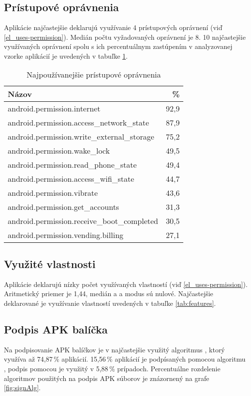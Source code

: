 \subsection*{Prístupové oprávnenia}

Aplikácie najčastejšie deklarujú využívanie 4 prístupových oprávnení (viď \ref{el_uses-permission}). Medián počtu vyžadovaných oprávnení je 8. 10 najčastejšie využívaných oprávnení spolu s ich percentuálnym zastúpením v analyzovanej vzorke aplikácií je uvedených v tabuľke \ref{tab:permissions}. 
\begin{table}[!htbp]
\centering
  \begin{tabular}{|l r|}
    \hline
    Názov & \% \\\hline\hline
    android.permission.internet & 92,9 \\
    android.permission.access\_network\_state & 87,9 \\
    android.permission.write\_external\_storage & 75,2 \\
    android.permission.wake\_lock & 49,5 \\
    android.permission.read\_phone\_state & 49,4 \\
    android.permission.access\_wifi\_state & 44,7 \\
    android.permission.vibrate & 43,6 \\
    android.permission.get\_accounts & 31,3 \\
    android.permission.receive\_boot\_completed & 30,5 \\
    android.permission.vending.billing & 27,1 \\
    \hline
  \end{tabular}
  \caption{Najpoužívanejšie prístupové oprávnenia}
  \label{tab:permissions}
\end{table}

\subsection*{Využité vlastnosti}
Aplikácie deklarujú nízky počet využívaných vlastností (viď \ref{el_uses-permission}). Aritmetický priemer je 1,44, medián a a modus sú nulové. Najčastejšie deklarované je využívanie vlastností uvedených v tabuľke \ref{tab:features}.

\subsection*{Podpis APK balíčka}
Na podpisovanie APK balíčkov je v najčastejšie využitý algoritmus , ktorý využíva až 74,87\,\% aplikácií. 15,56\,\% aplikácií je podpísaných pomocou algoritmu , podpis pomocou  je využitý v 5,88\,\% prípadoch. Percentuálne rozdelenie algoritmov použitých na podpis APK súborov je znázornený na grafe \ref{fig:signAlg}.


